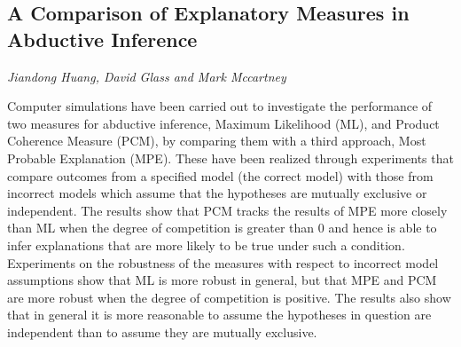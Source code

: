 \documentclass[../booklet.tex]{subfiles}
\begin{document}
\subsection[A Comparison of Explanatory Measures in Abductive Inference. {\it Jiandong Huang, David Glass and Mark Mccartney}]{A Comparison of Explanatory Measures in Abductive Inference}
  

\begin{center}
  {\it Jiandong Huang, David Glass and Mark Mccartney}
\end{center}

\vskip 0.8cm

Computer simulations have been carried out to investigate the performance of two measures for abductive inference, Maximum Likelihood (ML), and Product Coherence Measure (PCM), by comparing them with a third approach, Most Probable Explanation (MPE). These have been realized through experiments that compare outcomes from a specified model (the correct model) with those from incorrect models which assume that the hypotheses are mutually exclusive or independent. The results show that PCM tracks the results of MPE more closely than ML when the degree of competition is greater than 0 and hence is able to infer explanations that are more likely to be true under such a condition. Experiments on the robustness of the measures with respect to incorrect model assumptions show that ML is more robust in general, but that MPE and PCM are more robust when the degree of competition is positive.  The results also show that in general it is more reasonable to assume the hypotheses in question are independent than to assume they are mutually exclusive. 

\end{document}
